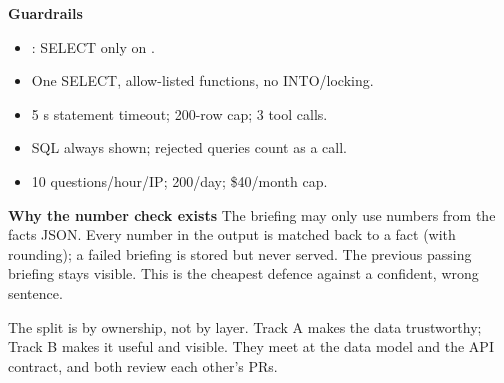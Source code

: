 \documentclass[10.5pt]{article}
\begin{document}
\vspace{4pt}
\begin{minipage}[t]{0.49\linewidth}
\begin{accentcard}
{\bfseries Guardrails}
\begin{itemize}[leftmargin=1.05em,itemsep=1.5pt,topsep=2pt]
  \item {}: SELECT only on .
  \item One SELECT, allow-listed functions, no INTO/locking.
  \item 5 s statement timeout; 200-row cap; 3 tool calls.
  \item SQL always shown; rejected queries count as a call.
  \item 10 questions/hour/IP; 200/day; \$40/month cap.
\end{itemize}
\end{accentcard}
\end{minipage}\hfill
\begin{minipage}[t]{0.49\linewidth}
\begin{warncard}
{\bfseries Why the number check exists}
The briefing may only use numbers from the facts JSON. Every number in the output is matched back to a fact (with rounding); a failed briefing is stored but never served. The previous passing briefing stays visible. This is the cheapest defence against a confident, wrong sentence.
\end{warncard}
\end{minipage}

\newpage
{}

{\small
The split is by ownership, not by layer. Track A makes the data trustworthy; Track B makes it useful and visible. They meet at the data model and the API contract, and both review each other's PRs.
}
\end{document}
